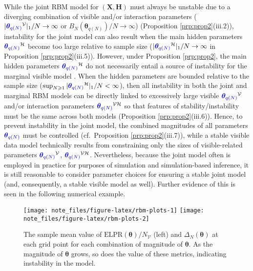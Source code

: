 \documentclass[numbib]{imamat}
\theoremstyle{theorem}
\theoremstyle{lemma}
\theoremstyle{example}
\theoremstyle{corollary}
\theoremstyle{definition}
\theoremstyle{remark}
\theoremstyle{approximation}
\theoremstyle{scheme}
\newcommand{\DN}{\Delta_N}
\newcommand{\thetaidx}{q(N)}
\newcommand{\thetaN}{\boldsymbol \theta_{\thetaidx}}
\newcommand{\Gam}{B_{N}(\thetaN) }
\newcommand{\ak}[1]{{\color{blue} #1}}
\begin{document}
\ak{While} the joint RBM model for \((\boldsymbol X,\boldsymbol H)\) must always be unstable due to a diverging combination of visible and/or interaction parameters (\(|\ak{\thetaN}^{\mathcal{V}}|_1/N\to \infty\) or \(\Gam/N\to \infty\)) (Proposition \ref{prp:prop2}(iii.2)), instability for the joint model can also result when the main hidden parameters \(\ak{\thetaN}^{\mathcal{H}}\) become too large relative to sample size (\(|\ak{\thetaN}^{\mathcal{H}}|_1/N\to \infty\) in Proposition \ref{prp:prop2}(iii.5)). However, under Proposition \ref{prp:prop2}, the main hidden parameters \(\ak{\thetaN}^{\mathcal{H}}\) do not necessarily entail a source of instability for the marginal visible model\ak{. 
When} the hidden parameters are bounded relative to the sample size (\(\sup_{N\geq 1} |\ak{\thetaN}^{\mathcal{H}}|_1/N<\infty\)), then all instability in both the joint and marginal RBM models can be directly linked to excessively large visible \(\ak{\thetaN}^{\mathcal{V}}\) and/or interaction parameters \(\ak{\thetaN}^{\mathcal{VH}}\) so that features of stability/instability must be the same across both models (Proposition \ref{prp:prop2}(iii.6)). Hence, to prevent instability in the joint model, the combined magnitudes of all parameters \(\ak{\thetaN}\) must be controlled (cf.~Proposition \ref{prp:prop2}(iii.7)), while a stable visible data model technically results \ak{from} constraining only the sizes of visible-related parameters \(\ak{\thetaN}^{\mathcal{V}}\), \(\ak{\thetaN}^{\mathcal{VH}}\). Nevertheless, because the joint model \ak{often is} employed in practice for purposes of simulation and simulation-based inference, it is still reasonable to consider parameter choices for ensuring a stable joint model (and, consequently, a stable visible model as well). Further evidence of this is seen in the following numerical example.
\begin{figure}
\texttt{[image: note\_files/figure-latex/rbm-plots-1]} \texttt{[image: note\_files/figure-latex/rbm-plots-2]} \caption{The sample mean value of $\text{ELPR}(\boldsymbol \theta)/N_{\mathcal{V}}$ (left) and $\DN(\boldsymbol \theta)$ at each grid point for each combination of magnitude of $\boldsymbol \theta$. As the magnitude of $\boldsymbol \theta$ grows, so does the value of these metrics, indicating \ak{instability} in the model.}\label{fig:rbm-plots}
\end{figure}
\par
\end{document}
